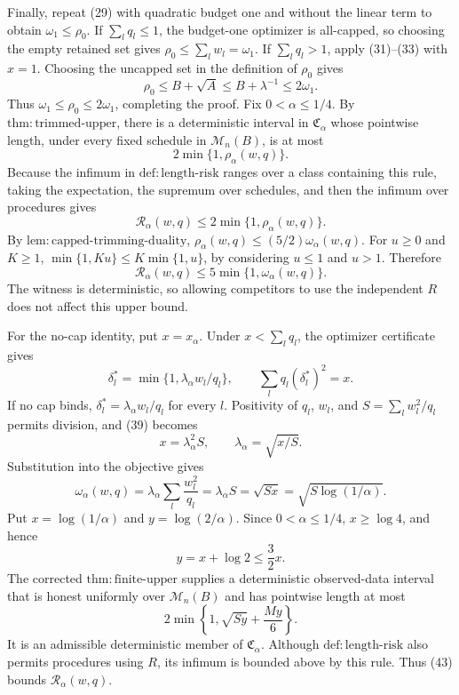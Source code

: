 Finally, repeat (29) with quadratic budget one and without the linear term to obtain \(\omega_1\le\rho_0\). If \(\sum_lq_l\le1\), the budget-one optimizer is all-capped, so choosing the empty retained set gives \(\rho_0\le\sum_lw_l=\omega_1\). If \(\sum_lq_l>1\), apply (31)--(33) with \(x=1\). Choosing the uncapped set in the definition of \(\rho_0\) gives
\[
 \rho_0\le B+\sqrt A
 \le B+\lambda^{-1}
 \le2\omega_1.
\tag{35}
\]
Thus \(\omega_1\le\rho_0\le2\omega_1\), completing the proof.
Fix \(0<\alpha\le1/4\). By \(\mathrm{thm{:}trimmed\text{-}upper}\), there is a deterministic interval in \(\mathfrak C_\alpha\) whose pointwise length, under every fixed schedule in \(\mathcal M_n(B)\), is at most
\[
 2\min\{1,\rho_\alpha(w,q)\}.
\tag{36}
\]
Because the infimum in \(\mathrm{def{:}length\text{-}risk}\) ranges over a class containing this rule, taking the expectation, the supremum over schedules, and then the infimum over procedures gives
\[
 \mathcal R_\alpha(w,q)\le2\min\{1,\rho_\alpha(w,q)\}.
\tag{37}
\]
By \(\mathrm{lem{:}capped\text{-}trimming\text{-}duality}\), \(\rho_\alpha(w,q)\le(5/2)\omega_\alpha(w,q)\). For \(u\ge0\) and \(K\ge1\), \(\min\{1,Ku\}\le K\min\{1,u\}\), by considering \(u\le1\) and \(u>1\). Therefore
\[
 \mathcal R_\alpha(w,q)\le5\min\{1,\omega_\alpha(w,q)\}.
\tag{38}
\]
The witness is deterministic, so allowing competitors to use the independent \(R\) does not affect this upper bound.

For the no-cap identity, put \(x=x_\alpha\). Under \(x<\sum_lq_l\), the optimizer certificate gives
\[
 \delta_l^*=\min\{1,\lambda_\alpha w_l/q_l\},
 \qquad
 \sum_lq_l(\delta_l^*)^2=x.
\tag{39}
\]
If no cap binds, \(\delta_l^*=\lambda_\alpha w_l/q_l\) for every \(l\). Positivity of \(q_l\), \(w_l\), and \(S=\sum_lw_l^2/q_l\) permits division, and (39) becomes
\[
 x=\lambda_\alpha^2S,
 \qquad
 \lambda_\alpha=\sqrt{x/S}.
\tag{40}
\]
Substitution into the objective gives
\[
 \omega_\alpha(w,q)
 =\lambda_\alpha\sum_l\frac{w_l^2}{q_l}
 =\lambda_\alpha S
 =\sqrt{Sx}
 =\sqrt{S\log(1/\alpha)}.
\tag{41}
\]
Put \(x=\log(1/\alpha)\) and \(y=\log(2/\alpha)\). Since \(0<\alpha\le1/4\), \(x\ge\log4\), and hence
\[
 y=x+\log2\le\frac32x.
\tag{42}
\]
The corrected \(\mathrm{thm{:}finite\text{-}upper}\) supplies a deterministic observed-data interval that is honest uniformly over \(\mathcal M_n(B)\) and has pointwise length at most
\[
 2\min\left\{1,\sqrt{Sy}+\frac{My}{6}\right\}.
\tag{43}
\]
It is an admissible deterministic member of \(\mathfrak C_\alpha\). Although \(\mathrm{def{:}length\text{-}risk}\) also permits procedures using \(R\), its infimum is bounded above by this rule. Thus (43) bounds \(\mathcal R_\alpha(w,q)\).

